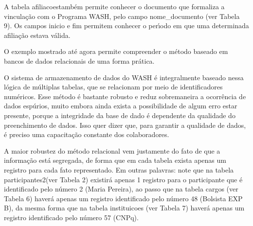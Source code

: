 \documentclass[
12pt,		%
openright,	%
twoside,  %
a4paper,			%
chapter=TITLE,		%
english,			%
french,				%
spanish,			%
brazil				%
]{USPSC-classe/USPSC}
\begin{document}
A tabela \textquotedbl afiliacoes\textquotedbl  tamb\'em permite conhecer o documento que formaliza a vincula\c{c}\~ao com o Programa WASH, pelo campo nome\_documento (ver Tabela 9). Os campos \textquotedbl inicio \textquotedbl  e \textquotedbl fim \textquotedbl  permitem conhecer o per\'{\i}odo em que uma determinada afilia\c{c}\~ao estava v\'alida.

















O exemplo mostrado at\'e agora permite compreender o m\'etodo baseado em bancos de dados relacionais de uma forma pr\'atica.

















O sistema de armazenamento de dados do WASH \'e integralmente baseado nessa l\'ogica de m\'ultiplas tabelas, que se relacionam por meio de identificadores num\'ericos. Esse m\'etodo \'e bastante robusto e reduz sobremaneira a ocorr\^encia de dados esp\'urios, muito embora ainda exista a possibilidade de algum erro estar presente, porque a integridade da base de dado \'e dependente da qualidade do preenchimento de dados. Isso quer dizer que, para garantir a qualidade de dados, \'e preciso uma capacita\c{c}\~ao constante dos colaboradores.

















A maior robustez do m\'etodo relacional vem justamente do fato de que a informa\c{c}\~ao est\'a segregada, de forma que em cada tabela exista apenas um registro para cada fato representado. Em outras palavras: note que na tabela \textquotedbl participantes2\textquotedbl  (ver Tabela 2) existir\'a apenas 1 registro para o participante que \'e identificado pelo n\'umero 2 (Maria Pereira), ao passo que na tabela \textquotedbl cargos \textquotedbl  (ver Tabela 6) haver\'a apenas um registro identificado pelo n\'umero 48 (Bolsista EXP B), da mesma forma que na tabela \textquotedbl instituicoes \textquotedbl  (ver Tabela 7) haver\'a apenas um registro identificado pelo n\'umero 57 (CNPq).
\end{document}
